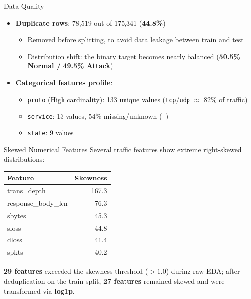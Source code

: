 \documentclass{beamer}
\begin{document}
\begin{frame}{Data Quality}
  \begin{itemize}
    \item \textbf{Duplicate rows}: 78,519 out of 175,341 (\textbf{44.8\%})
      \begin{itemize}
        \item Removed before splitting, to avoid data leakage between train and test
        \item Distribution shift: the binary target becomes nearly balanced (\textbf{50.5\% Normal / 49.5\% Attack})
      \end{itemize}
    \vspace{0.3cm}
    \item \textbf{Categorical features profile}:
      \begin{itemize}
        \item \texttt{proto} (High cardinality): 133 unique values (\texttt{tcp}/\texttt{udp}
          $\approx$ 82\% of traffic)
        \item \texttt{service}: 13 values, 54\% missing/unknown (\texttt{-})
        \item \texttt{state}: 9 values
      \end{itemize}
  \end{itemize}
\end{frame}

\begin{frame}{Skewed Numerical Features}
  Several traffic features show extreme right-skewed distributions:
  \begin{center}
    \begin{tabular}{lr}
      \toprule
      \textbf{Feature} & \textbf{Skewness} \\
      \midrule
      trans\_depth & 167.3 \\
      response\_body\_len & 76.3 \\
      sbytes & 45.3 \\
      sloss & 44.8 \\
      dloss & 41.4 \\
      spkts & 40.2 \\
      \bottomrule
    \end{tabular}
  \end{center}
  \vspace{0.3cm}
  \textbf{29 features} exceeded the skewness threshold ($> 1.0$) during raw EDA; after deduplication on the train split, \textbf{27 features} remained skewed and were transformed via \textbf{log1p}.
\end{frame}
\end{document}
